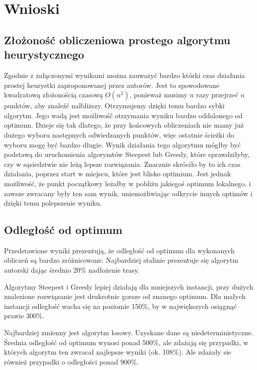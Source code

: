 \section{Wnioski}

\subsection{Złożoność obliczeniowa prostego algorytmu heurystycznego}

Zgodnie z załączonymi wynikami można zauważyć bardzo którki czas działania prostej
heurystki zaproponowanej przez autorów. Jest to spowodowane kwadratową złożonością 
czasową $ O(n^{2}) $, ponieważ musimy $ n $ razy przejrzeć $ n $ punktów, aby znaleźć
nalbliższy. Otrzymujemy dzięki temu bardzo sybki algorytm. Jego wadą jest 
możliwość otrzymania wyniku bardzo oddalonego od optimum. Dzieje się tak dlatego, 
że przy końcowych obliczeniach nie mamy już dużego wyboru następnych odwiedzanych 
punktów, więc ostatnie ścieżki do wyboru mogę być bardzo długie. Wynik działania 
tego algorytmu mógłby być podstawą do uruchomienia algorymtów Steepest lub Greedy, 
które sprawdziłyby, czy w sąsiedztwie nie leżą lepsze rozwiązania. Znacznie skróciło
by to ich czas działania, poprzez start w miejscu, które jest blisko optimium.
Jest jednak możliwość, że punkt początkowy leżałby w pobliżu jakiegoś optimum 
lokalnego, i zawsze zwracany były ten sam wynik, uniemożliwiając odkrycie innych 
optimów i dzięki temu polepszenie wyniku.

\subsection{Odległość od optimum}

Przedstawione wyniki prezentują, że odległość od optimum dla wykonanych obliczeń 
są bardzo zróżnicowane. Najbardziej stalinie prezentuje się algorytm autorski 
dając średnio 20\% nadłożenie trasy. 

Algorytmy Steepest i Greedy lepiej działają dla mniejszych instancji, przy dużych 
znalezione rozwiązanie jest drukrotnie gorsze od znanego optimum. Dla małych instancji
odległość wacha się na poziomie 150\%, by w największych osiągnąć prawie 300\%.

Najbardziej zmienny jest algorytm losowy. Uzyskane dane są niedeterministyczne. Średnia
odległość od optimum wynosi ponad 500\%, ale zdażają się przypadki, w których algorytm ten 
zwracał najlepsze wyniki (ok. 108\%). Ale zdażały sie również przypadki o odległości ponad
900\%.

